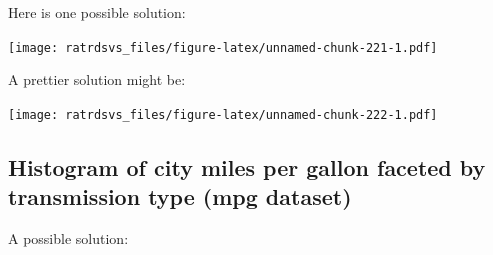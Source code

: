 \documentclass[
]{book}
\newenvironment{Shaded}{\begin{snugshade}}{\end{snugshade}}
\newcommand{\DataTypeTok}[1]{\textcolor[rgb]{0.13,0.29,0.53}{#1}}
\newcommand{\KeywordTok}[1]{\textcolor[rgb]{0.13,0.29,0.53}{\textbf{#1}}}
\newcommand{\NormalTok}[1]{#1}
\newcommand{\OperatorTok}[1]{\textcolor[rgb]{0.81,0.36,0.00}{\textbf{#1}}}
\newcommand{\StringTok}[1]{\textcolor[rgb]{0.31,0.60,0.02}{#1}}
\begin{document}
Here is one possible solution:

\begin{Shaded}
\end{Shaded}

\texttt{[image: ratrdsvs\_files/figure-latex/unnamed-chunk-221-1.pdf]}

A prettier solution might be:

\begin{Shaded}
\end{Shaded}

\texttt{[image: ratrdsvs\_files/figure-latex/unnamed-chunk-222-1.pdf]}

\hypertarget{histogram-of-city-miles-per-gallon-faceted-by-transmission-type-mpg-dataset}{%
\subsection{Histogram of city miles per gallon faceted by transmission type (mpg dataset)}\label{histogram-of-city-miles-per-gallon-faceted-by-transmission-type-mpg-dataset}}

A possible solution:

\begin{Shaded}
\end{Shaded}
\end{document}
